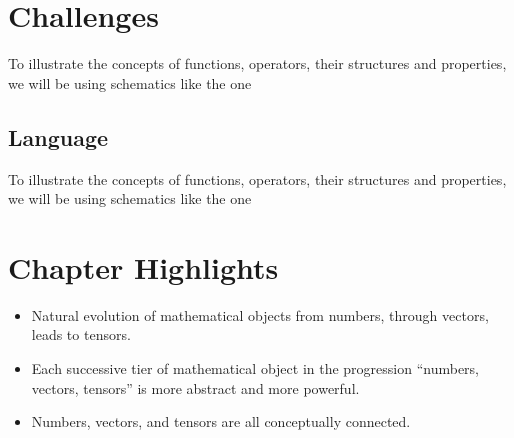 \section{Challenges}
To illustrate the concepts of functions, operators, their structures and
properties, we will be using schematics like the one

\subsection{Language}
To illustrate the concepts of functions, operators, their structures and
properties, we will be using schematics like the one

\vspace{1cm}
\section*{Chapter Highlights}
{\chhc
  \it
\begin{itemize}
\item Natural evolution of mathematical objects from numbers, through
  vectors, leads to tensors.
\item Each successive tier of mathematical object in the progression
  ``numbers, vectors, tensors''  is more abstract and more powerful.
\item Numbers, vectors, and tensors are all conceptually connected.
\end{itemize}
}

